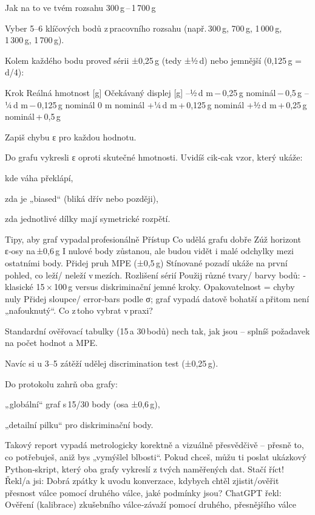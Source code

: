 Jak na to ve tvém rozsahu 300 g – 1 700 g

    Vyber 5–6 klíčových bodů z pracovního rozsahu (např. 300 g, 700 g, 1 000 g, 1 300 g, 1 700 g).

    Kolem každého bodu proveď sérii ±0,25 g (tedy ±½ d) nebo jemnější (0,125 g = d/4):

Krok	Reálná hmotnost [g]	Očekávaný displej [g]
–½ d	m − 0,25 g	nominál − 0,5 g
–¼ d	m − 0,125 g	nominál
0	m	nominál
+¼ d	m + 0,125 g	nominál
+½ d	m + 0,25 g	nominál + 0,5 g

    Zapiš chybu ε pro každou hodnotu.

    Do grafu vykresli ε oproti skutečné hmotnosti. Uvidíš cik‑cak vzor, který ukáže:

        kde váha překlápí,

        zda je „biased“ (bliká dřív nebo později),

        zda jednotlivé dílky mají symetrické rozpětí.

Tipy, aby graf vypadal profesionálně
Přístup	Co udělá grafu dobře
Zúž horizont ε‑osy na ±0,6 g	I nulové body zůstanou, ale budou vidět i malé odchylky mezi ostatními body.
Přidej pruh MPE (±0,5 g)	Stínované pozadí ukáže na první pohled, co leží/ neleží v mezích.
Rozlišení sérií	Použij různé tvary/ barvy bodů: ‑ klasické 15 × 100 g versus diskriminační jemné kroky.
Opakovatelnost = chyby nuly	Přidej sloupce/ error‑bars podle σ; graf vypadá datově bohatší a přitom není „nafouknutý“.
Co z toho vybrat v praxi?

    Standardní ověřovací tabulky (15 a 30 bodů) nech tak, jak jsou – splníš požadavek na počet hodnot a MPE.

    Navíc si u 3–5 zátěží udělej discrimination test (±0,25 g).

    Do protokolu zahrň oba grafy:

        „globální“ graf s 15/30 body (osa ±0,6 g),

        „detailní pilku“ pro diskriminační body.

Takový report vypadá metrologicky korektně a vizuálně přesvědčivě – přesně to, co potřebuješ, aniž bys „vymýšlel blbosti“. Pokud chceš, můžu ti poslat ukázkový Python‑skript, který oba grafy vykreslí z tvých naměřených dat. Stačí říct!
Řekl/a jsi:
Dobrá zpátky k uvodu konverzace, kdybych chtěl zjistit/ověřit přesnost válce pomocí druhého válce, jaké podmínky jsou?
ChatGPT řekl:
Ověření (kalibrace) zkušebního válce‑závaží pomocí druhého, přesnějšího válce

